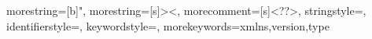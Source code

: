    
{
  morestring=[b]",
  morestring=[s]{>}{<},
  morecomment=[s]{<?}{?>},
  stringstyle=\color{black},
  identifierstyle=\color{darkblue},
  keywordstyle=\color{cyan},
  morekeywords={xmlns,version,type}%
}


\usepackage[nomain,acronym,nonumberlist,nopostdot]{glossaries}
\let\glossarysection\chapter
\renewcommand*{\acronymname}{List of Abbreviations}
\makeglossaries
